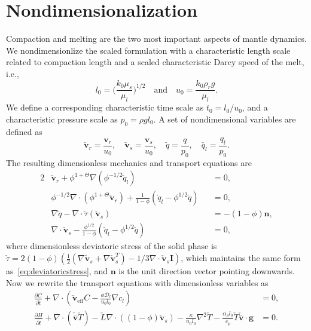 \section{Nondimensionalization}
\label{sec:nondim}
Compaction and melting are the two most important aspects of mantle dynamics.
We nondimensionlize the scaled formulation with a characteristic length scale related to 
compaction length and a scaled characteristic Darcy speed of the melt, i.e., 
\begin{equation}\label{eq:physcalscales}
l_0 = \Big( \frac{k_0 \mu_s}{\mu_l} \Big)^{1/2} \quad\text{and}\quad u_0 = \frac{k_0 \rho_r g}{\mu_l}.
\end{equation}
We define a corresponding characteristic time scale as $t_0 = l_0/u_0$, and a characteristic pressure scale
as $p_0 = \rho g l_0$. 
A set of nondimensional variables are defined as
\begin{equation}
\check{\mathbf{v}}_r = \frac{\mathbf{v}_r}{u_0}, \quad \check{\mathbf{v}}_s = \frac{\mathbf{v}_s}{u_0}, \quad 
\check{q} = \frac{q}{p_0}, \quad \check{q_l} = \frac{q_l}{p_0}.
\end{equation}
The resulting dimensionless mechanics and transport equations are
\begin{alignat}{2}
\label{eq:dimensionlessdarcy_flow_sc}
		  &\check{\mathbf{v}}_r
		  + \phi^{1+\Theta}\nabla(\phi^{-1/2}\check{q}_l)
        &&= 0,\\
\label{eq:dimensionlessconsMass_flow_sc}
		  &\phi^{-1/2}\nabla \cdot(\phi^{1+\Theta}\check{\mathbf{v}}_r)
        + \frac{1}{1-\phi}(\check{q}_l - \phi^{1/2}\check{q}) &&=0,\\
\label{eq:dimensionlessstokes_flow_sc}
		  &\nabla \check{q} - \nabla \cdot \check{\tau}(\check{\mathbf{v}}_s) &&= -(1-\phi)\mathbf{n},\\
\label{eq:dimensionlesscompaction_flow_sc}
		  &\nabla \cdot \check{\mathbf{v}}_s
        - \frac{\phi^{1/2}}{1-\phi}(\check{q}_l - \phi^{1/2}\check{q}) &&=0,
\end{alignat}
where dimensionless deviatoric stress of the solid phase is 
$\check{\tau} = 2(1-\phi)(\frac{1}{2} (\nabla \check{\mathbf{v}}_s + \nabla \check{\mathbf{v}}_s^T) - 
1/3\nabla \cdot \check{\mathbf{v}}_s \mathbf{I})$, which maintains the same form as~\eqref{eq:deviatoricstress}, and 
$\mathbf{n}$ is the unit direction vector pointing downwards. Now we rewrite the transport equations with dimensionless 
variables as
\begin{equation}\label{dimensionlesstransport}
		  \begin{aligned}
					 \frac{\partial C}{\partial \check{t}} + \nabla \cdot (\check{\mathbf{v}}_{\text{eff}} C - \frac{\phi \mathcal{D}_l}{u_0l_0} \nabla c_l) &= 0,\\
					 \frac{\partial H}{\partial \check{t}} + \nabla \cdot (\check{\overline{\mathbf{v}}} \check{T}) - 
					 \check{L} \nabla \cdot ((1-\phi) \check{\mathbf{v}}_s) - \frac{\kappa}{u_0l_0} \nabla^2 \check{T} -  
					 \frac{\alpha_\rho l_0}{c_p} \check{T} \check{\overline{\mathbf{v}}} \cdot \mathbf{g} &= 0.
		  \end{aligned}
\end{equation}
